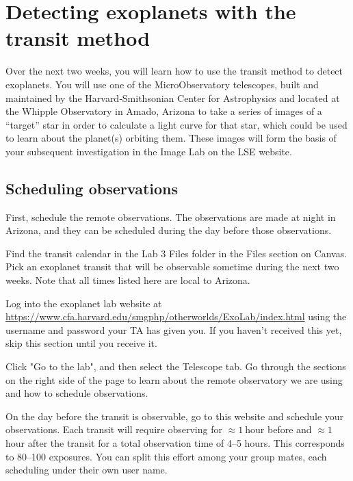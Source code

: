 \chapter{Detecting exoplanets with the transit method}


Over the next two weeks, you will learn how to use the transit method to detect exoplanets. You will use    one    of    the    MicroObservatory    telescopes,    built    and    maintained    by    the    Harvard‐Smithsonian    Center    for    Astrophysics    and    located    at    the    Whipple    Observatory    in    Amado,    Arizona    to    take    a    series    of    images    of    a    ``target''    star in order to calculate a light curve for that star, which could be used to learn about the planet(s) orbiting them.    These    images    will    form    the    basis    of    your    subsequent    investigation in the Image Lab on the LSE website.

\section{Scheduling observations}

First, schedule the remote observations. The observations are made at night in Arizona, and they can be scheduled during the day before those observations.

\begin{steps}
	\item Find the transit calendar in the Lab 3 Files folder in the Files section on Canvas. Pick an exoplanet transit that will be observable sometime during the next two weeks. Note that all times listed here are local to Arizona.
	
	\item Log into the exoplanet lab website at \url{https://www.cfa.harvard.edu/smgphp/otherworlds/ExoLab/index.html} using the username and password your TA has given you. If you haven't received this yet, skip this section until you receive it.
	
	\item Click "Go to the lab", and then select the Telescope tab. Go through the sections on the right side of the page to learn
	about the remote observatory we are using and how to schedule observations.
	
	\item On the day before the transit is observable, go to this website and schedule your observations. Each transit will require observing for $\approx 1\:$hour before and $\approx 1\:$hour after the
	transit for a total observation time of 4--5 hours. This corresponds to 80--100 exposures. You can split this effort among your group mates, each scheduling under their own user name.
\end{steps}

